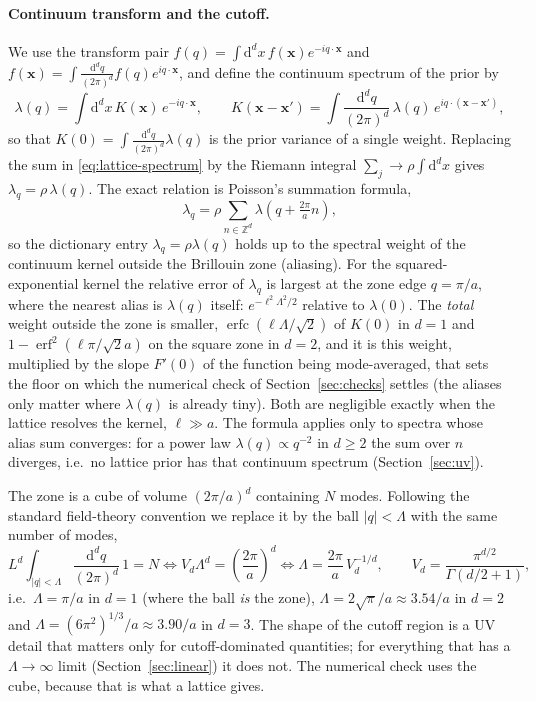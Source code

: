 \documentclass[11pt,a4paper]{article}
\newcommand{\Z}{\mathbb Z}
\newcommand{\dd}{\mathrm d}
\newcommand{\Lam}{\Lambda}
\newcommand{\ball}[1]{\int_{|q|<\Lam}\frac{\dd^d q}{(2\pi)^d}\,#1}
\begin{document}
\paragraph{Continuum transform and the cutoff.}
We use the transform pair $f(q) = \int\dd^dx\, f(\mathbf x)e^{-iq\cdot\mathbf x}$ and $f(\mathbf x) = \int\frac{\dd^dq}{(2\pi)^d}f(q)e^{iq\cdot\mathbf x}$, and define the continuum spectrum of the prior by
\begin{equation}
  \lambda(q) = \int\dd^dx\,K(\mathbf x)\,e^{-iq\cdot\mathbf x},
  \qquad
  K(\mathbf x-\mathbf x') = \int\frac{\dd^dq}{(2\pi)^d}\,\lambda(q)\,e^{iq\cdot(\mathbf x-\mathbf x')},
  \label{eq:cont-spectrum}
\end{equation}
so that $K(0) = \int\frac{\dd^dq}{(2\pi)^d}\lambda(q)$ is the prior variance of a single weight. Replacing the sum in \eqref{eq:lattice-spectrum} by the Riemann integral $\sum_j\to\rho\int\dd^dx$ gives $\lambda_q = \rho\,\lambda(q)$. The exact relation is Poisson's summation formula,
\begin{equation}
  \lambda_q = \rho\sum_{n\in\Z^d}\lambda\!\left(q + \tfrac{2\pi}{a}n\right),
  \label{eq:aliasing}
\end{equation}
so the dictionary entry $\lambda_q = \rho\lambda(q)$ holds up to the spectral weight of the continuum kernel outside the Brillouin zone (aliasing). For the squared-exponential kernel the relative error of $\lambda_q$ is largest at the zone edge $q = \pi/a$, where the nearest alias is $\lambda(q)$ itself: $e^{-\ell^2\Lam^2/2}$ relative to $\lambda(0)$. The \emph{total} weight outside the zone is smaller, $\operatorname{erfc}(\ell\Lam/\sqrt2)$ of $K(0)$ in $d=1$ and $1-\operatorname{erf}^2(\ell\pi/\sqrt2a)$ on the square zone in $d=2$, and it is this weight, multiplied by the slope $F'(0)$ of the function being mode-averaged, that sets the floor on which the numerical check of Section~\ref{sec:checks} settles (the aliases only matter where $\lambda(q)$ is already tiny). Both are negligible exactly when the lattice resolves the kernel, $\ell\gg a$. The formula applies only to spectra whose alias sum converges: for a power law $\lambda(q)\propto q^{-2}$ in $d\ge2$ the sum over $n$ diverges, i.e.\ no lattice prior has that continuum spectrum (Section~\ref{sec:uv}).

The zone is a cube of volume $(2\pi/a)^d$ containing $N$ modes. Following the standard field-theory convention we replace it by the ball $|q|<\Lam$ with the same number of modes,
\begin{equation}
  L^d\ball{1} = N
  \iff
  V_d\Lam^d = \left(\frac{2\pi}{a}\right)^d
  \iff
  \Lam = \frac{2\pi}{a}\,V_d^{-1/d},
  \qquad
  V_d = \frac{\pi^{d/2}}{\Gamma(d/2+1)},
  \label{eq:cutoff}
\end{equation}
i.e.\ $\Lam = \pi/a$ in $d=1$ (where the ball \emph{is} the zone), $\Lam = 2\sqrt\pi/a \approx 3.54/a$ in $d=2$ and $\Lam = (6\pi^2)^{1/3}/a \approx 3.90/a$ in $d=3$. The shape of the cutoff region is a UV detail that matters only for cutoff-dominated quantities; for everything that has a $\Lam\to\infty$ limit (Section~\ref{sec:linear}) it does not. The numerical check uses the cube, because that is what a lattice gives.
\end{document}
